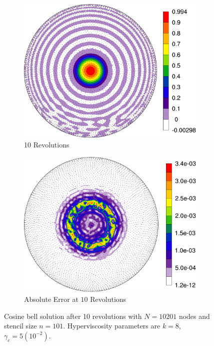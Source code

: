 \documentclass{report}
\begin{document}
\begin{figure}[ht!]
\begin{center}
\begin{subfigure}[b]{0.55\textwidth}
	\includegraphics[width=1.0\textwidth]{../figures/paper1/cosine_bell/cosineComputedSolution.pdf}
	\caption{10 Revolutions}
	\label{fig:cosine_approx}
\end{subfigure}
\begin{subfigure}[b]{0.55\textwidth}
	\includegraphics[width=1.0\textwidth]{../figures/paper1/cosine_bell/cosineAbsoluteError-eps-converted-to.pdf}
	\caption{Absolute Error at $10$ Revolutions}
	\label{fig:cosine_abserror}
\end{subfigure}
\caption{Cosine bell solution after 10 revolutions with $N=10201$ nodes and stencil size $n=101$.
Hyperviscosity parameters are $k = 8$, $\gamma_c = 5(10^{-2})$.
}
 \label{fig:cosine_10revs}
\end{center}
\end{figure}
\end{document}

